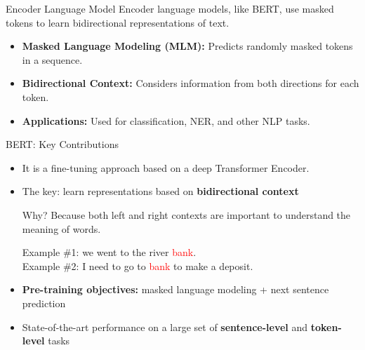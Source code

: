 \documentclass[serif, aspectratio=169]{beamer}
\begin{document}
\begin{frame}{Encoder Language Model}
    Encoder language models, like BERT, use masked tokens to learn bidirectional representations of text.
    \vspace{0.5cm}
    \begin{itemize}
        \item \textbf{Masked Language Modeling (MLM):} Predicts randomly masked tokens in a sequence.
        \item \textbf{Bidirectional Context:} Considers information from both directions for each token.
        \item \textbf{Applications:} Used for classification, NER, and other NLP tasks.
    \end{itemize}
\end{frame}

\begin{frame}{BERT: Key Contributions}
    
    \vspace{0.5cm}
    
    \begin{itemize}
        \item It is a fine-tuning approach based on a deep Transformer Encoder.
        
        \vspace{0.3cm}
        
        \item The key: learn representations based on \textbf{bidirectional context}
        
        \vspace{0.2cm}
        
        \textcolor{green!50!black}{
        Why? Because both left and right contexts are important to understand the meaning of words.}
        
        \vspace{0.2cm}
        
        Example \#1: we went to the river \textcolor{red}{bank}. \\
        Example \#2: I need to go to \textcolor{red}{bank} to make a deposit.
        
        \vspace{0.5cm}
        
        \item \textbf{Pre-training objectives:} masked language modeling + next sentence prediction
        
        \vspace{0.3cm}
        
        \item State-of-the-art performance on a large set of \textbf{sentence-level} and \textbf{token-level} tasks
    \end{itemize}
    
\end{frame}
\end{document}
